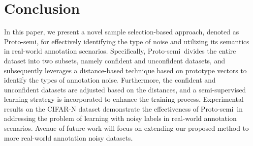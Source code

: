 \documentclass[letterpaper]{article} %
\newcommand{\method}{Proto-semi}
\begin{document}
\section{Conclusion}
In this paper, we present a novel sample selection-based approach, denoted as \method, for effectively identifying the type of noise and utilizing its semantics in real-world annotation scenarios. Specifically, \method\ divides the entire dataset into two subsets, namely confident and unconfident datasets, and subsequently leverages a distance-based technique based on prototype vectors to identify the types of annotation noise. Furthermore, the confident and unconfident datasets are adjusted based on the distances, and a semi-supervised learning strategy is incorporated to enhance the training process. Experimental results on the CIFAR-N dataset demonstrate the effectiveness of \method\ in addressing the problem of learning with noisy labels in real-world annotation scenarios. Avenue of future work will focus on extending our proposed method to more real-world annotation noisy datasets.


\end{document}
